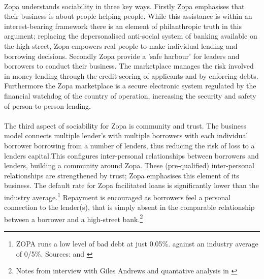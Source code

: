 \documentclass[12pt,a4paper,titlepage]{article}
\begin{document}
\paragraph{}Zopa understands sociability in three key ways. Firstly Zopa emphasises that their business is about people helping people. While this assistance is within an interest-bearing framework there is an element of philanthropic truth in this argument; replacing the depersonalised anti-social system of banking available on the high-street, Zopa empowers real people to make individual lending and borrowing decisions. Secondly Zopa provide a 'safe harbour' for leaders and borrowers to conduct their business. The marketplace manages the risk involved in money-lending through the credit-scoring of applicants and by enforcing debts. Furthermore the Zopa marketplace is a secure electronic system regulated by the financial watchdog of the country of operation, increasing the security and safety of person-to-person lending. 

\paragraph{}The third aspect of sociability for Zopa is community and trust. The business model connects multiple lender's with multiple borrowers with each individual borrower borrowing from a number of lenders, thus reducing the risk of loss to a lenders capital.This configures inter-personal relationships between borrowers and lenders, building a community around Zopa. These (pre-qualified) inter-personal relationships are strengthened by trust; Zopa emphasises this element of its business. The default rate for Zopa facilitated loans is significantly lower than the industry average.\footnote{ZOPA runs a low level of bad debt at just 0.05\%. against an industry average of 0/5\%. Sources: \cite{Hawkes:2007} and \cite{Cattermole:2004}} Repayment is encouraged as borrowers feel a personal connection to the lender(s), that is simply absent in the comparable relationship between a borrower and a high-street bank.\footnote{Notes from interview with Giles Andrews and quantative analysis in \cite{hulme:2006sl}}
\end{document}
